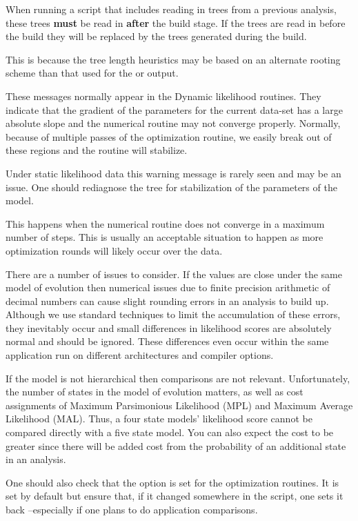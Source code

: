 {When running a script that includes reading in trees from a previous analysis, these trees {\bf must} be read 
in {\bf after} the build stage.  If the trees are read in before the build they will be replaced by the trees 
generated during the build.}

{This is because the tree length heuristics may be based on an alternate rooting scheme than that 
used for the  or  output.}

{These messages normally appear in the Dynamic likelihood routines. They indicate that the gradient
of the parameters for the current data-set has a large absolute slope and the numerical routine may
not converge properly. Normally, because of multiple passes of the optimization routine, we easily
break out of these regions and the routine will stabilize.

Under static likelihood data this warning message is rarely seen and may be an issue. One should
rediagnose the tree for stabilization of the parameters of the model.}

{This happens when the numerical routine does not converge in a maximum number of steps. This is
usually an acceptable situation to happen as more optimization rounds will likely occur over the
data.}

{There are a number of issues to consider. If the values are close under the same model of
evolution then numerical issues due to finite precision arithmetic of decimal numbers can cause
slight rounding errors in an analysis to build up. Although we use standard techniques to limit the
accumulation of these errors, they inevitably occur and small differences in likelihood scores are
absolutely normal and should be ignored. These differences even occur within the same application
run on different architectures and compiler options.

If the model is not hierarchical then comparisons are not relevant. Unfortunately, the number of
states in the model of evolution matters, as well as cost assignments of Maximum Parsimonious
Likelihood (MPL) and Maximum Average Likelihood (MAL). Thus, a four state models' likelihood score
cannot be compared directly with a five state model. You can also expect the cost to be greater
since there will be added cost from the probability of an additional state in an analysis.

One should also check that the  option is set for the optimization routines.
It is set by default but ensure that, if it changed somewhere in the script, one sets it back
--especially if one plans to do application comparisons.}
